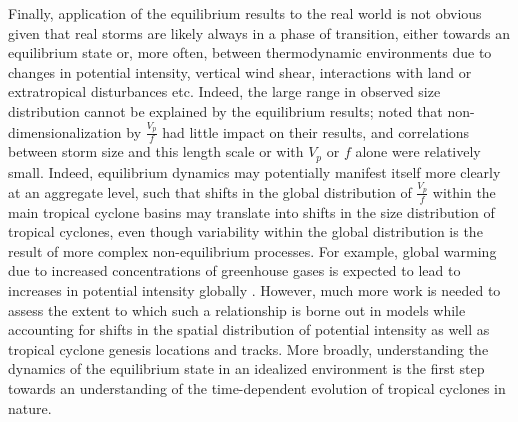 \documentclass[12pt]{article}
\begin{document}
Finally, application of the equilibrium results to the real world is not obvious given that real storms are likely always in a phase of transition, either towards an equilibrium state or, more often, between thermodynamic environments due to changes in potential intensity, vertical wind shear, interactions with land or extratropical disturbances etc. Indeed, the large range in observed size distribution cannot be explained by the equilibrium results; \cite{Chavas_Emanuel_2010} noted that non-dimensionalization by $\frac{V_p}{f}$ had little impact on their results, and correlations between storm size and this length scale or with $V_p$ or $f$ alone were relatively small.  Indeed, equilibrium dynamics may potentially manifest itself more clearly at an aggregate level, such that shifts in the global distribution of $\frac{V_p}{f}$ within the main tropical cyclone basins may translate into shifts in the size distribution of tropical cyclones, even though variability within the global distribution is the result of more complex non-equilibrium processes.  For example, global warming due to increased concentrations of greenhouse gases is expected to lead to increases in potential intensity globally \citep{Knutson_McBride_Chan_Emanuel_Holland_Landsea_Held_Kossin_Srivastava_Sugi_2010}. However, much more work is needed to assess the extent to which such a relationship is borne out in models while accounting for shifts in the spatial distribution of potential intensity as well as tropical cyclone genesis locations and tracks. More broadly, understanding the dynamics of the equilibrium state in an idealized environment is the first step towards an understanding of the time-dependent evolution of tropical cyclones in nature.
\end{document}
